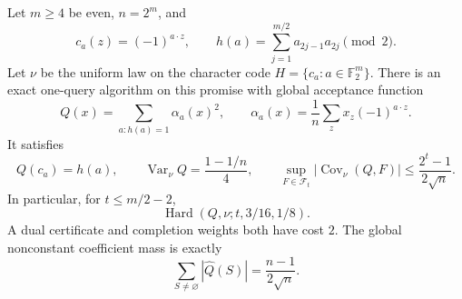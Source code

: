 \begin{proposition}
\label{ian:pac-character-check}
Let \(m\ge4\) be even, \(n=2^m\), and
\[
 c_a(z)=(-1)^{a\cdot z},\qquad
 h(a)=\sum_{j=1}^{m/2}a_{2j-1}a_{2j}\pmod2.
\]
Let \(\nu\) be the uniform law on the character code
\(H=\{c_a:a\in\mathbb F_2^m\}\).
There is an exact one-query algorithm on this promise with global
acceptance function
\[
 Q(x)=\sum_{a:h(a)=1}\alpha_a(x)^2,\qquad
 \alpha_a(x)=\frac1n\sum_zx_z(-1)^{a\cdot z}.
 \tag{32.18}\label{ian:pac-bv-acceptance}
\]
It satisfies
\[
 Q(c_a)=h(a),\qquad
 \operatorname{Var}_\nu Q=\frac{1-1/n}{4},
 \qquad
 \sup_{F\in\mathcal F_t}|\operatorname{Cov}_\nu(Q,F)|
 \le\frac{2^t-1}{2\sqrt n}.
 \tag{32.19}\label{ian:pac-bv-hardness}
\]
In particular, for \(t\le m/2-2\),
\[
 \operatorname{Hard}(Q,\nu;t,3/16,1/8).
\]
A dual certificate and completion weights both have cost \(2\).
The global nonconstant coefficient mass is exactly
\[
 \sum_{S\ne\varnothing}|\widehat Q(S)|
     =\frac{n-1}{2\sqrt n}.
 \tag{32.20}\label{ian:pac-bv-coefficients}
\]
\end{proposition}

